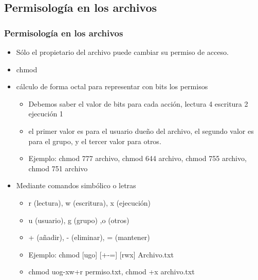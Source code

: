 \documentclass{beamer}
\begin{document}
\subsection{Permisolog\'ia en los archivos}
\begin{frame}
\frametitle{Permisolog\'ia en los archivos}
	\begin{itemize}
	\item S\'olo el propietario del archivo puede cambiar su permiso de acceso.
	\item chmod
	\item c\'alculo de forma octal para representar con bits los permisos
		\begin{itemize}
			\item Debemos saber el valor de bits para cada acci\'on, lectura 4 escritura 2 ejecuci\'on 1
			\item el primer valor es para el usuario due\~no del archivo, el segundo valor es para el grupo, y el tercer valor para otros.
			\item \alert {Ejemplo: } chmod 777 archivo, chmod 644 archivo, chmod 755 archivo, chmod 751 archivo
		\end{itemize}
	\end{itemize}
\end{frame}

\begin{frame}
\begin{itemize}
\frametitle{Permisolog\'ia en los archivos}
\item Mediante comandos simb\'olico o  letras
\begin{itemize}
\item r (lectura), w (escritura), x (ejecuci\'on)
\item u (usuario), g (grupo) ,o (otros)
\item + (a\~nadir),  - (eliminar),  = (mantener)
\item \alert{Ejemplo:} chmod [ugo] [+-=] [rwx] Archivo.txt
\item chmod uog-xw+r permiso.txt, chmod +x archivo.txt
\end{itemize}
\end{itemize}
\end{frame}
\end{document}
